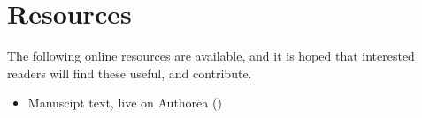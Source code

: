 \section{Resources}

The following online resources are available, and it is hoped that interested readers will find these useful, and contribute.

\begin{itemize}
\item Manuscipt text, live on Authorea ()
\end{itemize}
